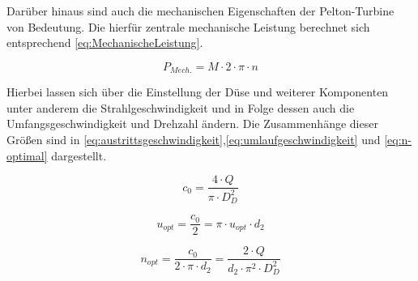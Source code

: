 Darüber hinaus sind auch die mechanischen Eigenschaften der Pelton-Turbine von Bedeutung.
Die hierfür zentrale mechanische Leistung berechnet sich entsprechend \autoref{eq:MechanischeLeistung}.

\begin{equation}
	P_{Mech.}= M \cdot 2 \cdot \pi \cdot n
\label{eq:MechanischeLeistung}
\end{equation}

Hierbei lassen sich über die Einstellung der Düse und weiterer Komponenten
unter anderem die Strahlgeschwindigkeit und in Folge dessen auch die
Umfangsgeschwindigkeit und Drehzahl ändern.
Die Zusammenhänge dieser Größen sind in \autoref{eq:austrittsgeschwindigkeit},\autoref{eq:umlaufgeschwindigkeit} und \autoref{eq:n-optimal} dargestellt.

\begin{equation}
    c_{0}=\frac{4 \cdot Q}{\pi \cdot D_{D}^2}
      \label{eq:austrittsgeschwindigkeit}
    \end{equation}

  \begin{equation}
    u_{opt} = \frac{c_{0}}{2}=\pi \cdot u_{opt} \cdot d_{2}
    \label{eq:umlaufgeschwindigkeit}
  \end{equation}
    
    \begin{equation}
     n_{opt}=\frac{c_{0}}{2 \cdot \pi \cdot d_{2}}=\frac{2 \cdot Q}{d_{2} \cdot \pi^2  \cdot D_{D}^2}
    \label{eq:n-optimal}
    \end{equation}
